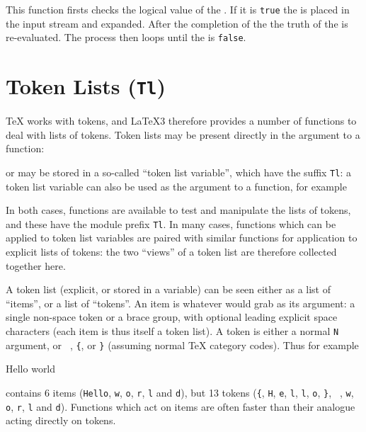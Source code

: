 \documentclass[oneside]{book}
\begin{document}
\begin{function}{\boolVarWhileDo}
\begin{syntax}
  
\end{syntax}
This function firsts checks the logical value of the .
If it is \texttt{true} the  is placed in the input stream
and expanded. After the completion of the  the truth
of the  is re-evaluated. The process then loops
until the  is \texttt{false}.
\begin{demohigh}
\IgnoreSpacesOn
\boolSetTrue \lTmpaBool
\intZero \lTmpaInt
\clistClear \lTmpaClist
\boolVarWhileDo {}
\clistVarJoin \lTmpaClist {:}
\IgnoreSpacesOff
\end{demohigh}
\end{function}

\chapter{Token Lists (\texttt{Tl})}

\TeX{} works with tokens, and \LaTeX3 therefore provides a number of
functions to deal with lists of tokens.  Token lists may be present
directly in the argument to a function:
\begin{codehigh}
\end{codehigh}
or may be stored in a so-called \enquote{token list variable}, which
have the suffix \texttt{Tl}: a token list variable can also be used as
the argument to a function, for example
\begin{codehigh}
\tlVarFoo \lSomeTl
\end{codehigh}
In both cases, functions are available to test and manipulate the lists
of tokens, and these have the module prefix \texttt{Tl}.
In many cases, functions which can be applied to token list variables
are paired with similar functions for application to explicit lists
of tokens: the two \enquote{views} of a token list are therefore collected
together here.

A token list (explicit, or stored in a variable) can be seen either
as a list of \enquote{items},
or a list of \enquote{tokens}. An item is whatever  would
grab as its argument: a single non-space token or a brace group,
with optional leading explicit space characters (each item is thus
itself a token list). A token is either a normal \texttt{N} argument,
or \verb*| |, \verb|{|, or \verb|}| (assuming normal \TeX{} category codes).
Thus for example
\begin{codehigh}
{Hello} world
\end{codehigh}
contains 6 items (\texttt{Hello}, \texttt{w}, \texttt{o}, \texttt{r},
\texttt{l} and \texttt{d}), but 13 tokens (\verb|{|, \texttt{H}, \texttt{e},
\texttt{l}, \texttt{l}, \texttt{o}, \verb|}|, \verb*| |, \texttt{w}, \texttt{o},
\texttt{r}, \texttt{l} and \texttt{d}).
Functions which act on items are often faster than their analogue acting
directly on tokens.
\end{document}
